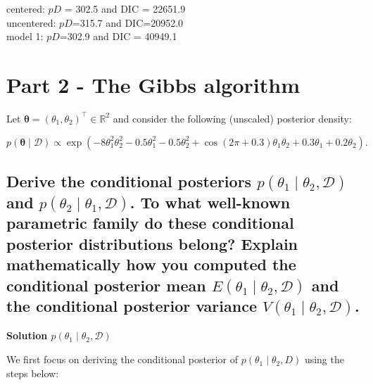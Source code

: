 \documentclass[12pt]{article}
\begin{document}
centered: $pD$ = 302.5 and DIC = 22651.9 \\
uncentered: $pD$=315.7 and DIC=20952.0 \\
model 1: $pD$=302.9 and DIC = 40949.1



\newpage
\section{Part 2 - The Gibbs algorithm}
Let \(\boldsymbol{\theta} = (\theta_1, \theta_2)^\top \in \mathbb{R}^2\) and consider the following (unscaled) posterior density:

\[
p(\boldsymbol{\theta} \mid \mathcal{D}) \propto \exp\left(-8\theta_1^2\theta_2^2 - 0.5\theta_1^2 - 0.5\theta_2^2 + \cos(2\pi + 0.3)\theta_1\theta_2 + 0.3\theta_1 + 0.2\theta_2 \right).
\]

\subsection{Derive the conditional posteriors \(p(\theta_1 \mid \theta_2, \mathcal{D})\) and \(p(\theta_2 \mid \theta_1, \mathcal{D})\). To what well-known parametric family do these conditional posterior distributions belong? Explain mathematically how you computed the conditional posterior mean \(E(\theta_1 \mid \theta_2, \mathcal{D})\) and the conditional posterior variance \(V(\theta_1 \mid \theta_2, \mathcal{D})\).} 
\textbf{Solution \(p(\theta_1 \mid \theta_2, \mathcal{D})\) }{\label{theta1}}

We first focus on deriving the conditional posterior of  \(p(\theta_1 \mid \theta_2, D)\) using the steps below:
\end{document}
